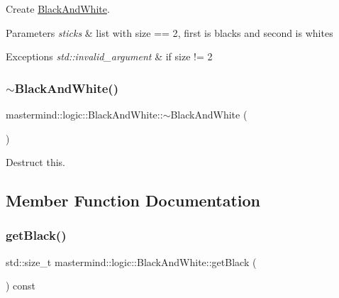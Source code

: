 Create \hyperlink{classmastermind_1_1logic_1_1_black_and_white}{Black\+And\+White}. 


\begin{DoxyParams}{Parameters}
{\em sticks} & list with {\ttfamily size == 2}, first is blacks and second is whites\\
\hline
\end{DoxyParams}

\begin{DoxyExceptions}{Exceptions}
{\em std\+::invalid\+\_\+argument} & if {\ttfamily size != 2} \\
\hline
\end{DoxyExceptions}
\hypertarget{classmastermind_1_1logic_1_1_black_and_white_aba480247d6d6b92e190b427f95781202}{}\label{classmastermind_1_1logic_1_1_black_and_white_aba480247d6d6b92e190b427f95781202} 
\subsubsection{\texorpdfstring{$\sim$\+Black\+And\+White()}{~BlackAndWhite()}}
{\footnotesize\ttfamily mastermind\+::logic\+::\+Black\+And\+White\+::$\sim$\+Black\+And\+White (\begin{DoxyParamCaption}{ }\end{DoxyParamCaption})\hspace{0.3cm}{\ttfamily [virtual]}}



Destruct this. 



\subsection{Member Function Documentation}
\hypertarget{classmastermind_1_1logic_1_1_black_and_white_a5215b8ea947ec23c323448b46ba9e897}{}\label{classmastermind_1_1logic_1_1_black_and_white_a5215b8ea947ec23c323448b46ba9e897} 
\subsubsection{\texorpdfstring{get\+Black()}{getBlack()}}
{\footnotesize\ttfamily std\+::size\+\_\+t mastermind\+::logic\+::\+Black\+And\+White\+::get\+Black (\begin{DoxyParamCaption}{ }\end{DoxyParamCaption}) const}



